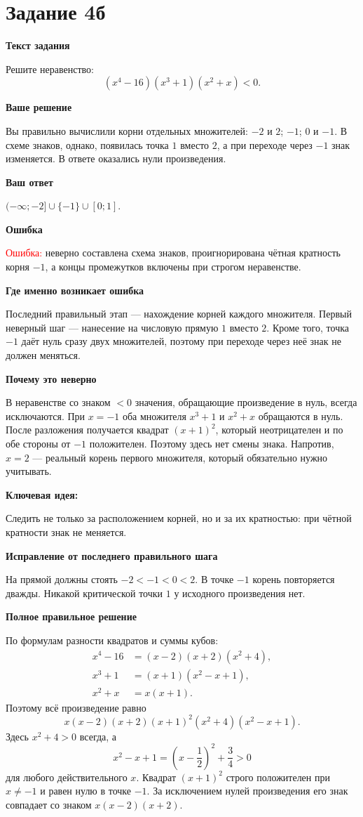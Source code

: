 \documentclass[12pt,a4paper]{article}
\newcommand{\parthead}[1]{\par\medskip\textbf{#1}\par\smallskip}
\begin{document}
\newpage
{}\label{task:4b}
\section*{Задание 4б}
\parthead{Текст задания}
Решите неравенство:
\[
(x^4-16)(x^3+1)(x^2+x)<0.
\]
\parthead{Ваше решение}
Вы правильно вычислили корни отдельных множителей: $-2$ и $2$; $-1$; $0$ и $-1$. В схеме знаков, однако, появилась точка $1$ вместо $2$, а при переходе через $-1$ знак изменяется. В ответе оказались нули произведения.
\parthead{Ваш ответ}
$(-\infty;-2]\cup\{-1\}\cup[0;1]$.
\parthead{Ошибка}
\textcolor{red}{Ошибка:} неверно составлена схема знаков, проигнорирована чётная кратность корня $-1$, а концы промежутков включены при строгом неравенстве.
\parthead{Где именно возникает ошибка}
Последний правильный этап --- нахождение корней каждого множителя. Первый неверный шаг --- нанесение на числовую прямую $1$ вместо $2$. Кроме того, точка $-1$ даёт нуль сразу двух множителей, поэтому при переходе через неё знак не должен меняться.
\parthead{Почему это неверно}
В неравенстве со знаком $<0$ значения, обращающие произведение в нуль, всегда исключаются. При $x=-1$ оба множителя $x^3+1$ и $x^2+x$ обращаются в нуль. После разложения получается квадрат $(x+1)^2$, который неотрицателен и по обе стороны от $-1$ положителен. Поэтому здесь нет смены знака. Напротив, $x=2$ --- реальный корень первого множителя, который обязательно нужно учитывать.
\parthead{\textcolor{blue!60!black}{Ключевая идея:}}
Следить не только за расположением корней, но и за их кратностью: при чётной кратности знак не меняется.
\parthead{Исправление от последнего правильного шага}
На прямой должны стоять $-2<-1<0<2$. В точке $-1$ корень повторяется дважды. Никакой критической точки $1$ у исходного произведения нет.
\parthead{Полное правильное решение}
По формулам разности квадратов и суммы кубов:
\begin{align*}
x^4-16&=(x-2)(x+2)(x^2+4),\\
x^3+1&=(x+1)(x^2-x+1),\\
x^2+x&=x(x+1).
\end{align*}
Поэтому всё произведение равно
\[
x(x-2)(x+2)(x+1)^2(x^2+4)(x^2-x+1).
\]
Здесь $x^2+4>0$ всегда, а
\[
x^2-x+1=\left(x-\frac12\right)^2+\frac34>0
\]
для любого действительного $x$. Квадрат $(x+1)^2$ строго положителен при $x\ne-1$ и равен нулю в точке $-1$. За исключением нулей произведения его знак совпадает со знаком $x(x-2)(x+2)$.
\end{document}
